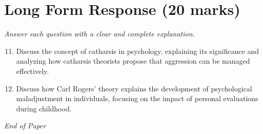 \documentclass[12pt]{article}
\begin{document}
\section*{Long Form Response (20 marks)}
\textit{Answer each question with a clear and complete explanation.}
\begin{enumerate}[label=\arabic*.]
\setcounter{enumi}{10}
\item Discuss the concept of catharsis in psychology, explaining its significance and analyzing how catharsis theorists propose that aggression can be managed effectively.
\item Discuss how Carl Rogers' theory explains the development of psychological maladjustment in individuals, focusing on the impact of personal evaluations during childhood.
\end{enumerate}

\vfill
\noindent\textit{End of Paper}
\end{document}
